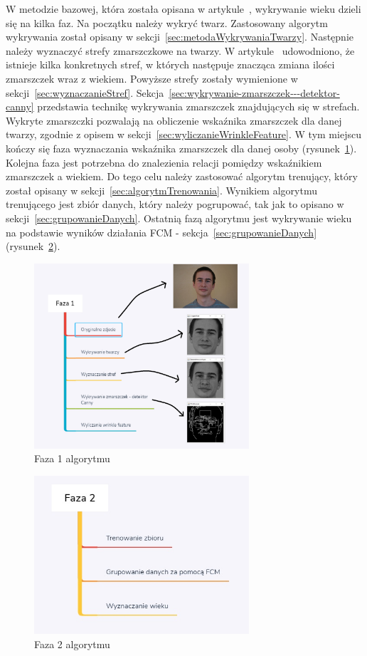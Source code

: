 \documentclass[a4paper,twoside,12pt]{book}
\begin{document}
    W metodzie bazowej, która została opisana w artykule~\cite{wrinkleFeatures}, wykrywanie wieku dzieli się na kilka
    faz.
    Na początku należy wykryć twarz.
    Zastosowany algorytm wykrywania został
    opisany w sekcji~\ref{sec:metodaWykrywaniaTwarzy}.
    Następnie należy wyznaczyć strefy zmarszczkowe na twarzy.
    W artykule~\cite{wrinkleFeatures} udowodniono,
    że istnieje kilka konkretnych stref, w których następuje znacząca zmiana ilości zmarszczek wraz z wiekiem.
    Powyższe strefy zostały wymienione w sekcji~\ref{sec:wyznaczanieStref}.
    Sekcja~\ref{sec:wykrywanie-zmarszczek---detektor-canny} przedstawia technikę
    wykrywania zmarszczek znajdujących się w strefach.
    Wykryte zmarszczki
    pozwalają na obliczenie wskaźnika zmarszczek dla danej twarzy, zgodnie z opisem w sekcji~\ref{sec:wyliczanieWrinkleFeature}.
    W tym miejscu kończy się faza wyznaczania wskaźnika zmarszczek dla danej osoby (rysunek~\ref{fig.faza1Algorytmu}).
    Kolejna faza
    jest potrzebna do
    znalezienia relacji pomiędzy wskaźnikiem zmarszczek a wiekiem.
    Do tego celu należy zastosować algorytm trenujący, który
    został opisany w sekcji~\ref{sec:algorytmTrenowania}.
    Wynikiem algorytmu trenującego jest zbiór danych, który
    należy pogrupować, tak jak to opisano w sekcji~\ref{sec:grupowanieDanych}.
    Ostatnią fazą algorytmu jest wykrywanie wieku
    na podstawie wyników działania FCM - sekcja~\ref{sec:grupowanieDanych} (rysunek~\ref{fig.faza2Algorytmu}).

    \begin{figure}[ht!]
        \centering
        \includegraphics[width=8cm]{Obrazy/Faza1.jpg}
        \caption{Faza 1 algorytmu}
        \label{fig.faza1Algorytmu}
    \end{figure}

    \begin{figure}[ht!]
        \centering
        \includegraphics[width=8cm]{Obrazy/Faza2.jpg}
        \caption{Faza 2 algorytmu}
        \label{fig.faza2Algorytmu}
    \end{figure}
\end{document}
